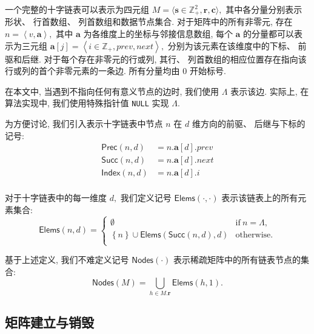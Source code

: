 一个完整的十字链表可以表示为四元组 $M = \langle \bm{s} \in \mathbb{Z}_{+}^{2}, \bm{r}, \bm{c} \rangle,$ 其中各分量分别表示形状、 行首数组、 列首数组和数据节点集合. 对于矩阵中的所有非零元, 存在 $n = \left\langle v, \bm{a} \right\rangle,$ 其中 $\bm{a}$ 为各维度上的坐标与邻接信息数组, 每个 $\bm{a}$ 的分量都可以表示为三元组 $\bm{a}[j] = \left\langle i \in \mathbb{Z}_+, prev, next\right\rangle,$ 分别为该元素在该维度中的下标、 前驱和后继. 对于每个存在非零元的行或列, 其行、 列首数组的相应位置存在指向该行或列的首个非零元素的一条边. 所有分量均由 0 开始标号.

在本文中, 当遇到不指向任何有意义节点的边时, 我们使用 $\Lambda$ 表示该边. 实际上, 在算法实现中, 我们使用特殊指针值 \texttt{NULL} 实现 $\Lambda.$

\newcommand{\Prec}[2]{\mathsf{Prec}(#1, #2)}
\newcommand{\Succ}[2]{\mathsf{Succ}(#1, #2)}
\newcommand{\Index}[2]{\mathsf{Index}(#1, #2)}
为方便讨论, 我们引入表示十字链表中节点 $n$ 在 $d$ 维方向的前驱、 后继与下标的记号:
\begin{equation}
    \begin{aligned}
        \Prec{n}{d} & = n.\bm{a}[d].prev\\
        \Succ{n}{d} & = n.\bm{a}[d].next\\
        \Index{n}{d} & = n.\bm{a}[d].i\\
    \end{aligned}
\end{equation}

\newcommand{\Elems}[2]{\mathsf{Elems}(#1, #2)}
对于十字链表中的每一维度 $d,$ 我们定义记号 $\Elems{\cdot}{\cdot}$ 表示该链表上的所有元素集合:
\begin{equation}
    \Elems{n}{d} = \begin{cases}
        \emptyset & \text{if}\ n = \Lambda,\\
        \left\{n\right\} \cup \Elems{\Succ{n}{d}}{d} & \text{otherwise}.\\
    \end{cases}
\end{equation}

\newcommand{\Nodes}[1]{\mathsf{Nodes}(#1)}
基于上述定义, 我们不难定义记号 $\Nodes{\cdot}$ 表示稀疏矩阵中的所有链表节点的集合:
\begin{equation}
    \Nodes{M} = \bigcup_{h \in M.\bm{r}} \Elems{h}{1}.
\end{equation}

\subsection{矩阵建立与销毁}

